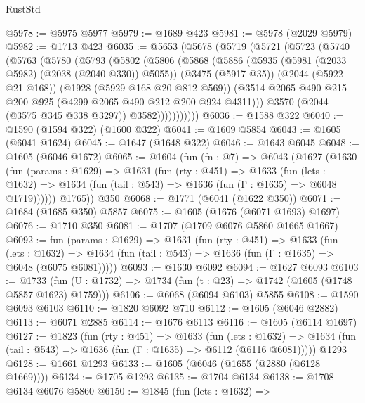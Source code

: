 \begin{lexlean}{RustStd}
\begin{coremodule}
{\begin{coremodule}
{{{{{{{{{{{{{{@5978 := @5975 @5977
@5979 := @1689 @423
@5981 := @5978 (@2029 @5979)
@5982 := @1713 @423
@6035 := @5653
    (@5678
      (@5719
        (@5721
          (@5723
            (@5740
              (@5763
                (@5780
                  (@5793
                    (@5802
                      (@5806
                        (@5868
                          (@5886
                            (@5935 (@5981 (@2033 @5982) (@2038 (@2040 @330)) @5055))
                            (@3475 (@5917 @35))
                            (@2044 (@5922 @21 @168))
                            (@1928 (@5929 @168 @20 @812 @569))
                            (@3514
                              @2065
                              @490
                              @215
                              @200
                              @925
                              (@4299 @2065 @490 @212 @200 @924 @4311)))
                          @3570
                          (@2044 (@3575 @345 @338 @3297))
                          @3582)))))))))))
@6036 := @1588 @322
@6040 := @1590 (@1594 @322) (@1600 @322)
@6041 := @1609 @5854
@6043 := @1605 (@6041 @1624)
@6045 := @1647 (@1648 @322)
@6046 := @1643 @6045
@6048 := @1605 (@6046 @1672)
@6065 := @1604
    (fun (fn : @7) =>
    @6043
      (@1627
        (@1630
          (fun (params : @1629) =>
          @1631
            (fun (rty : @451) =>
            @1633
              (fun (lets : @1632) =>
              @1634 (fun (tail : @543) => @1636 (fun (Γ : @1635) => @6048 @1719))))))
        @1765))
    @350
@6068 := @1771 (@6041 (@1622 @350))
@6071 := @1684 (@1685 @350) @5857
@6075 := @1605 (@1676 (@6071 @1693) @1697)
@6076 := @1710 @350
@6081 := @1707 (@1709 @6076 @5860 @1665 @1667)
@6092 := fun (params : @1629) =>
  @1631
    (fun (rty : @451) =>
    @1633
      (fun (lets : @1632) =>
      @1634 (fun (tail : @543) => @1636 (fun (Γ : @1635) => @6048 (@6075 @6081)))))
@6093 := @1630 @6092
@6094 := @1627 @6093
@6103 := @1733 (fun (U : @1732) => @1734 (fun (t : @23) => @1742 (@1605 (@1748 @5857 @1623) @1759)))
@6106 := @6068 (@6094 @6103) @5855
@6108 := @1590 @6093 @6103
@6110 := @1820 @6092 @710
@6112 := @1605 (@6046 @2882)
@6113 := @6071 @2885
@6114 := @1676 @6113
@6116 := @1605 (@6114 @1697)
@6127 := @1823
    (fun (rty : @451) =>
    @1633
      (fun (lets : @1632) =>
      @1634 (fun (tail : @543) => @1636 (fun (Γ : @1635) => @6112 (@6116 @6081)))))
    @1293
@6128 := @1661 @1293
@6133 := @1605 (@6046 (@1655 (@2880 (@6128 @1669))))
@6134 := @1705 @1293
@6135 := @1704 @6134
@6138 := @1708 @6134 @6076 @5860
@6150 := @1845
    (fun (lets : @1632) =>
}}}}}}}}}}}}}}
\end{coremodule}}
\end{coremodule}
\end{lexlean}
